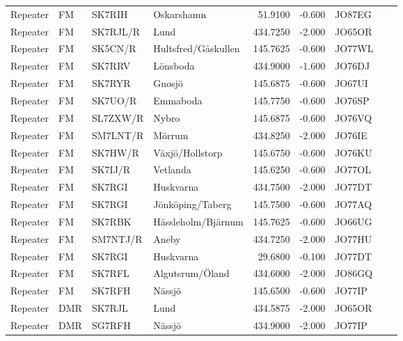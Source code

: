 \begin{longtable}{llllrrlcl}
	Repeater & FM              & SK7RIH   & Oskarshamn              &    51.9100 &   -0.600 & JO87EG &  \\
	Repeater & FM              & SK7RJL/R & Lund                    &   434.7250 &   -2.000 & JO65OR &  \\
	Repeater & FM              & SK5CN/R  & Hultsfred/Gåskullen     &   145.7625 &   -0.600 & JO77WL &  \\
	Repeater & FM              & SK7RRV   & Lönsboda                &   434.9000 &   -1.600 & JO76DJ &  \\
	Repeater & FM              & SK7RYR   & Gnosjö                  &   145.6875 &   -0.600 & JO67UI &  \\
	Repeater & FM              & SK7UO/R  & Emmaboda                &   145.7750 &   -0.600 & JO76SP &  \\
	Repeater & FM              & SL7ZXW/R & Nybro                   &   145.6875 &   -0.600 & JO76VQ &  \\
	Repeater & FM              & SM7LNT/R & Mörrum                  &   434.8250 &   -2.000 & JO76IE &  \\
	Repeater & FM              & SK7HW/R  & Växjö/Hollstorp         &   145.6750 &   -0.600 & JO76KU &  \\
	Repeater & FM              & SK7IJ/R  & Vetlanda                &   145.6250 &   -0.600 & JO77OL &  \\
	Repeater & FM              & SK7RGI   & Huskvarna               &   434.7500 &   -2.000 & JO77DT &  \\
	Repeater & FM              & SK7RGI   & Jönköping/Taberg        &   145.7500 &   -0.600 & JO77AQ &  \\
	Repeater & FM              & SK7RBK   & Hässleholm/Bjärnum      &   145.7625 &   -0.600 & JO66UG &  \\
	Repeater & FM              & SM7NTJ/R & Aneby                   &   434.7250 &   -2.000 & JO77HU &  \\
	Repeater & FM              & SK7RGI   & Huskvarna               &    29.6800 &   -0.100 & JO77DT &  \\
	Repeater & FM              & SK7RFL   & Algutsrum/Öland         &   434.6000 &   -2.000 & JO86GQ &  \\
	Repeater & FM              & SK7RFH   & Nässjö                  &   145.6500 &   -0.600 & JO77IP &  \\
	Repeater & DMR             & SK7RJL   & Lund                    &   434.5875 &   -2.000 & JO65OR &  \\
	Repeater & DMR             & SG7RFH   & Nässjö                  &   434.9000 &   -2.000 & JO77IP &  \\

\end{longtable}

